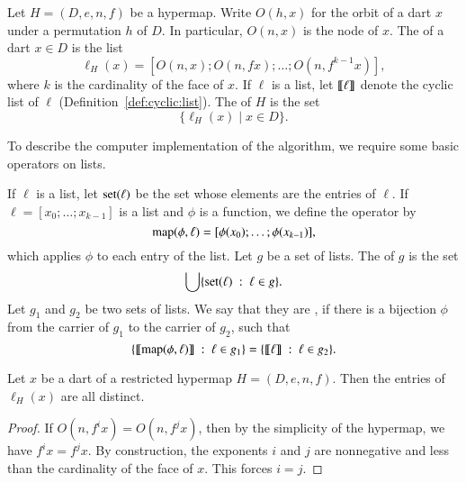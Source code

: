 \begin{definition}[listing]
  Let $H=(D,e,n,f)$ be a hypermap.  Write $O(h,x)$ for the orbit of a
  dart $x$ under a permutation $h$ of $D$.  In particular, $O(n,x)$ is
  the node of $x$.  The  of a dart $x\in D$ is the
  list
\[
\ell_H(x) = [O(n,x);O(n,f x);\ldots;O(n,f^{k-1} x)   ], 
\]
where $k$ is the cardinality of the face of $x$.  If $\ell$ is a list,
let ${\llbracket{\ell}\rrbracket}$ denote the cyclic list of $\ell$
(Definition~\ref{def:cyclic:list}).  The  of $H$ is
the set
\[
\{\ell_H(x) \mid x\in D\}.
\]
\end{definition}
%
%

To describe the computer implementation of the algorithm, we require
some basic operators on lists.

\begin{definition}
  If $\ell$ is a list, let ${\operatorname{set}}(\ell)$ be the set whose elements
  are the entries of $\ell$.  If $\ell=[x_0;\ldots;x_{k-1}]$ is a list
  and $\phi$ is a function, we define the operator  by
\[
{\operatorname{map}}(\phi,\ell) = [\phi(x_0);\ldots;\phi(x_{k-1})],
\]
which applies $\phi$ to each entry of the list.  Let $g$ be a set of
lists.  The  of $g$ is the set
\[
\bigcup \{ {\operatorname{set}}(\ell) \ :\  \ell\in g\}.
\]
Let $g_1$ and $g_2$ be two sets of lists.  We say that they are
, 
if there is a bijection $\phi$ from the
carrier of $g_1$ to the carrier of $g_2$, such that
\[
\{ {\llbracket{{\operatorname{map}}(\phi,\ell)}\rrbracket} \ :\  \ell \in g_1 \} = 
\{ {\llbracket{\ell}\rrbracket} \ :\  \ell \in g_2 \}.
\]
\end{definition}
%
%
%
%

\begin{lemma}\label{lemma:distinct:listing}
  Let $x$ be a dart of a restricted hypermap $H=(D,e,n,f)$.  Then the
  entries of $\ell_H(x)$ are all distinct.
\end{lemma}

\begin{proof}
  If $O(n,f^i x) = O(n,f^j x)$, then by the simplicity of the
  hypermap, we have $f^i x = f^j x$.  By construction, the exponents
  $i$ and $j$ are nonnegative and less than the cardinality of the
  face of $x$.  This forces $i=j$.
\end{proof}

